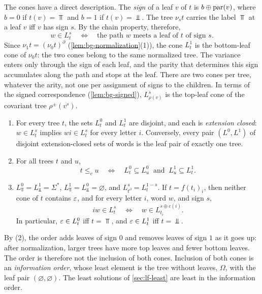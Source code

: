 The cones have a direct description. The \emph{sign} of a leaf $v$ of $t$ is
$b\oplus\operatorname{par}(v)$, where $b=0$ if $t(v)=\Top$ and $b=1$ if $t(v)=\Bot$.
The tree $\nu_st$ carries the label $\Top$ at a leaf $v$ iff $v$ has sign $s$.
By the chain property, therefore,
\begin{equation}\label{eq:lf-direct}
 w\in L^s_t\quad\Longleftrightarrow\quad
 \text{the path $w$ meets a leaf of $t$ of sign $s$.}
\end{equation}
Since $\nu_1t=(\nu_0t)^\partial$ (\cref{lem:bg-normalization}(1)), the cone
$L^1_t$ is the bottom-leaf cone of $\nu_0t$: the two cones belong to the same normalized tree. The variance
enters only through the sign of each leaf, and the parity that determines this
sign accumulates along the path and stops at the leaf. There are two cones per
tree, whatever the arity, not one per assignment of signs to the children.
In terms of the signed correspondence (\cref{lem:bg-signed}),
$L^s_{\rho(v)}$ is the top-leaf cone of the covariant tree $\rho^\pm(v^s)$.

\begin{theorem}\label{thm:lf-representation}
\leavevmode
\begin{enumerate}[leftmargin=*]
\item For every tree $t$, the sets $L^0_t$ and $L^1_t$ are disjoint, and each
  is \emph{extension closed}: $w\in L^s_t$ implies $wi\in L^s_t$ for every
  letter $i$. Conversely, every pair $(L^0,L^1)$ of disjoint extension-closed
  sets of words is the leaf pair of exactly one tree.
\item For all trees $t$ and $u$,
  \[
   t\le_c u\quad\Longleftrightarrow\quad
   L^0_t\subseteq L^0_u\ \text{ and }\ L^1_u\subseteq L^1_t .
  \]
\item $L^0_\Top=L^1_\Bot=\Sigma^*$, $L^1_\Top=L^0_\Bot=\varnothing$, and
  $L^s_{t^\partial}=L^{1-s}_t$. If $t=f(t_i)_i$, then neither cone of $t$
  contains $\varepsilon$, and for every letter $i$, word $w$, and sign $s$,
  \[
   iw\in L^s_t\quad\Longleftrightarrow\quad w\in L^{s\oplus c(i)}_{t_i}.
  \]
  In particular, $\varepsilon\in L^0_t$ iff $t=\Top$, and $\varepsilon\in L^1_t$ iff
  $t=\Bot$.
\end{enumerate}
\end{theorem}

By (2), the order adds leaves of sign $0$ and removes leaves of sign $1$ as
it goes up: after normalization, larger trees have more top leaves and fewer
bottom leaves. The order is therefore not the inclusion of both cones.
Inclusion of both cones is an \emph{information order}, whose least element
is the tree without leaves, $\Omega$, with the leaf pair
$(\varnothing,\varnothing)$. The least solutions of \cref{sec:lf-least} are
least in the information order.

